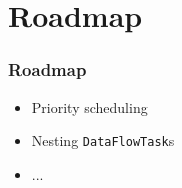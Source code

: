 \documentclass{beamer}
\newcommand{\DFT}{\texttt{DataFlowTasks.jl}}
\begin{document}
\section{Roadmap}



\begin{frame}
\frametitle{Roadmap}  

\begin{itemize}
  \item Priority scheduling
  \item Nesting \texttt{DataFlowTask}s
  \item ...
\end{itemize} 
\end{frame}
\end{document}
